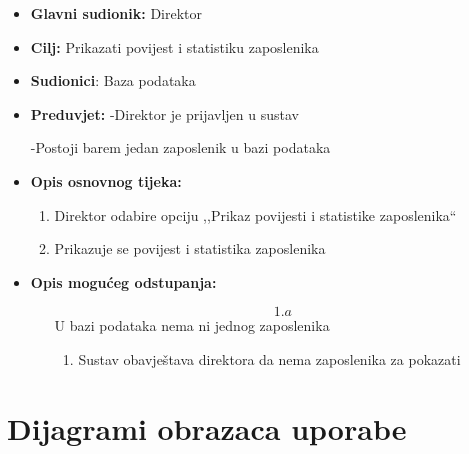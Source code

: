 \documentclass{article} %
\begin{document}
\begin{itemize}
	\item \textbf{Glavni sudionik:} Direktor
	
	
	\item \textbf{Cilj:} Prikazati povijest i statistiku zaposlenika
	
	
	\item \textbf{Sudionici}: Baza podataka
	
	
	\item \textbf{Preduvjet:} -Direktor je prijavljen u sustav
	
	\qquad\qquad\quad -Postoji barem jedan zaposlenik u bazi podataka
	
	
	\item \textbf{Opis osnovnog tijeka:} 
	\begin{enumerate}
		\item Direktor odabire opciju ,,Prikaz povijesti i statistike zaposlenika`` 
		
		
		\item Prikazuje se povijest i statistika zaposlenika
		
		
		
	\end{enumerate}
	\item \textbf{Opis mogućeg odstupanja:}
	
	\begin{enumerate}
		\item[$$1.a$$] U bazi podataka nema ni jednog zaposlenika
		
		\begin{enumerate}[label=\arabic*.]
			\item Sustav obavještava direktora da nema zaposlenika za pokazati
			
			
		\end{enumerate}
	\end{enumerate}
\end{itemize} 


\section{Dijagrami obrazaca uporabe}
\end{document}
